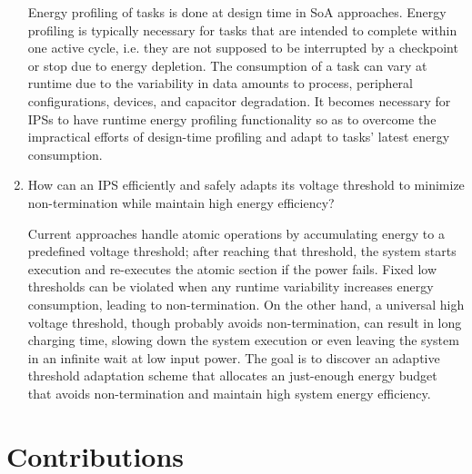 \begin{enumerate}
Energy profiling of tasks is done at design time in SoA approaches. 
Energy profiling is typically necessary for tasks that are intended to complete within one active cycle, i.e. they are not supposed to be interrupted by a checkpoint or stop due to energy depletion. 
The consumption of a task can vary at runtime due to the variability in data amounts to process, peripheral configurations, devices, and capacitor degradation. 
It becomes necessary for IPSs to have runtime energy profiling functionality so as to overcome the impractical efforts of design-time profiling and adapt to tasks' latest energy consumption.

\item How can an IPS efficiently and safely adapts its voltage threshold to minimize non-termination while maintain high energy efficiency? 

Current approaches handle atomic operations by accumulating energy to a predefined voltage threshold; after reaching that threshold, the system starts execution and re-executes the atomic section if the power fails. 
Fixed low thresholds can be violated when any runtime variability increases energy consumption, leading to non-termination. 
On the other hand, a universal high voltage threshold, though probably avoids non-termination, can result in long charging time, slowing down the system execution or even leaving the system in an infinite wait at low input power.
The goal is to discover an adaptive threshold adaptation scheme that allocates an just-enough energy budget that avoids non-termination and maintain high system energy efficiency. 

  
\end{enumerate}

\section{Contributions}

